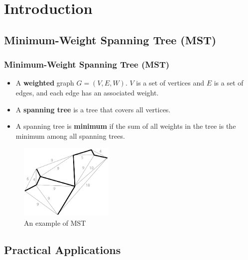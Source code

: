 \section{Introduction}

\subsection{Minimum-Weight Spanning Tree (MST)}

\begin{frame}
\frametitle{Minimum-Weight Spanning Tree (MST)}

\begin{itemize}
  \item A \textbf{weighted} graph $G = (V,E,W)$. $V$ is a set of vertices and $E$ is a set of edges, and each edge has an associated weight.
  \item A \textbf{spanning tree} is a tree that covers all vertices.
  \item A spanning tree is \textbf{minimum} if the sum of all weights in the tree is the minimum among all spanning trees.
\end{itemize}
\begin{figure}
    \centering
    \includegraphics[width=0.4\textwidth]{figures/mst.pdf}
    \caption{An example of MST}
\end{figure}
\end{frame}

\subsection{Practical Applications}

